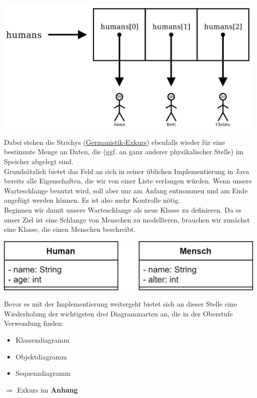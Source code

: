 \documentclass{article}
\begin{document}
\begin{center}
    \includegraphics[scale=0.2]{../media/queue_humans_arrows.png}
\end{center}
Dabei stehen die Strichys (\href{https://www.youtube.com/watch?v=xVmGb7qACfA&t}{Germanistik-Exkurs}) ebenfalls wieder für eine bestimmte Menge an Daten, die (ggf. an ganz anderer physikalischer Stelle) im Speicher abgelegt sind. \\ 
Grundsätzlich bietet das Feld an sich in seiner üblichen Implementierung in Java bereits alle Eigenschaften, die wir 
von einer Liste verlangen würden. Wenn unsere Warteschlange benutzt wird, soll aber nur am Anfang 
entnommen und am Ende angefügt werden können. Es ist also mehr Kontrolle nötig. \\
Beginnen wir damit unsere Warteschlange als neue Klasse zu definieren. Da es unser Ziel ist eine Schlange von Menschen zu modellieren, brauchen wir zunächst eine Klasse, die einen Menschen beschreibt. 

\begin{center}
    \includegraphics[scale=0.25]{../media/human.png}
\end{center}

Bevor es mit der Implementierung weitergeht bietet sich an dieser Stelle eine Wiederholung der wichtigsten drei Diagrammarten an, die in der Oberstufe Verwendung finden:
\begin{itemize}
    \item Klassendiagramm
    \item Objektdiagramm
    \item Sequenzdiagramm
\end{itemize}
$\Rightarrow$ Exkurs im \textbf{Anhang}
\end{document}
